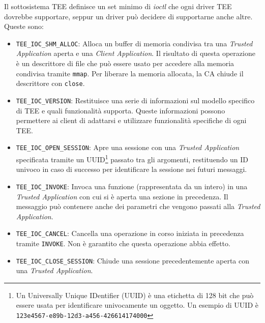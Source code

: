 \documentclass[12pt,italian]{report}
\begin{document}
Il sottosistema TEE definisce un set minimo di \textit{ioctl} che ogni
driver TEE dovrebbe supportare, seppur un driver può decidere di
supportarne anche altre.
Queste sono:
\begin{itemize}
    \item \texttt{TEE\_IOC\_SHM\_ALLOC}:
        Alloca un buffer di memoria condivisa tra una
        \textit{Trusted Application} aperta e una
        \textit{Client Application}.
        Il risultato di questa operazione è un descrittore
        di file che può essere usato per accedere alla memoria condivisa
        tramite \texttt{mmap}.
        Per liberare la memoria allocata, la CA chiude il descrittore con
        \texttt{close}. 

    \item \texttt{TEE\_IOC\_VERSION}:
        Restituisce una serie di informazioni sul modello specifico di TEE e
        quali funzionalità supporta.
        Queste informazioni possono permettere ai client di adattarsi e
        utilizzare funzionalità specifiche di ogni TEE.

    \item \texttt{TEE\_IOC\_OPEN\_SESSION}:
        Apre una sessione con una \textit{Trusted Application} specificata
        tramite un UUID\footnote{
            Un Universally Unique IDentifier (UUID) è una etichetta di 128 bit
            che può essere usata per identificare univocamente un oggetto.
            Un esempio di UUID è \texttt{123e4567-e89b-12d3-a456-426614174000}
        } passato tra gli argomenti, restituendo
        un ID univoco in caso di successo per identificare la sessione nei
        futuri messaggi.

    \item \texttt{TEE\_IOC\_INVOKE}:
        Invoca una funzione (rappresentata da un intero) in una
        \textit{Trusted Application} con cui si è aperta una sezione
        in precedenza.
        Il messaggio può contenere anche dei parametri che vengono passati
        alla \textit{Trusted Application}.

    \item \texttt{TEE\_IOC\_CANCEL}:
        Cancella una operazione in corso iniziata in precedenza tramite
        \texttt{INVOKE}.
        Non è garantito che questa operazione abbia effetto.

    \item \texttt{TEE\_IOC\_CLOSE\_SESSION}:
        Chiude una sessione precedentemente aperta con una
        \textit{Trusted Application}.
\end{itemize}
\end{document}
